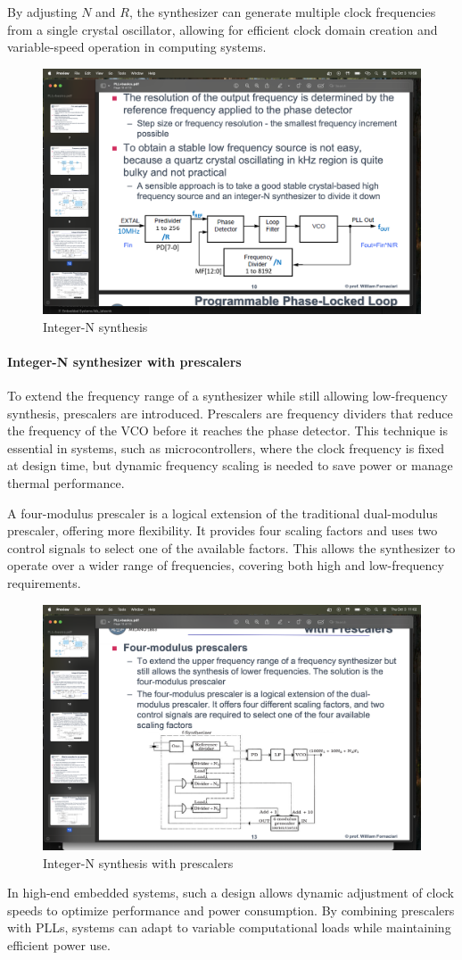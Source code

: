 By adjusting $N$ and $R$, the synthesizer can generate multiple clock frequencies from a single crystal oscillator, allowing for efficient clock domain creation and variable-speed operation in computing systems.
\begin{figure}[H]
    \centering
    \includegraphics[width=0.75\linewidth]{images/freqn.png}
    \caption{Integer-N synthesis}
\end{figure}

\paragraph*{Integer-N synthesizer with prescalers}
To extend the frequency range of a synthesizer while still allowing low-frequency synthesis, prescalers are introduced. 
Prescalers are frequency dividers that reduce the frequency of the VCO before it reaches the phase detector. 
This technique is essential in systems, such as microcontrollers, where the clock frequency is fixed at design time, but dynamic frequency scaling is needed to save power or manage thermal performance.

A four-modulus prescaler is a logical extension of the traditional dual-modulus prescaler, offering more flexibility. 
It provides four scaling factors and uses two control signals to select one of the available factors. 
This allows the synthesizer to operate over a wider range of frequencies, covering both high and low-frequency requirements.
\begin{figure}[H]
    \centering
    \includegraphics[width=0.75\linewidth]{images/freqp.png}
    \caption{Integer-N synthesis with prescalers}
\end{figure}
In high-end embedded systems, such a design allows dynamic adjustment of clock speeds to optimize performance and power consumption.
By combining prescalers with PLLs, systems can adapt to variable computational loads while maintaining efficient power use.
